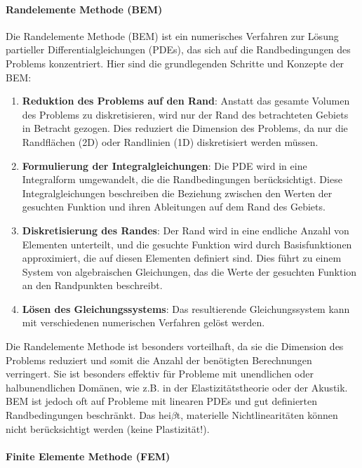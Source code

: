 \paragraph{Randelemente Methode (BEM)}

Die Randelemente Methode (BEM) ist ein numerisches Verfahren zur Lösung partieller Differentialgleichungen (PDEs), das sich auf die Randbedingungen des Problems konzentriert. Hier sind die grundlegenden Schritte und Konzepte der BEM:

\begin{enumerate}
\item \textbf{Reduktion des Problems auf den Rand}: Anstatt das gesamte Volumen des Problems zu diskretisieren, wird nur der Rand des betrachteten Gebiets in Betracht gezogen. Dies reduziert die Dimension des Problems, da nur die Randflächen (2D) oder Randlinien (1D) diskretisiert werden müssen.
\item \textbf{Formulierung der Integralgleichungen}: Die PDE wird in eine Integralform umgewandelt, die die Randbedingungen berücksichtigt. Diese Integralgleichungen beschreiben die Beziehung zwischen den Werten der gesuchten Funktion und ihren Ableitungen auf dem Rand des Gebiets.
\item \textbf{Diskretisierung des Randes}: Der Rand wird in eine endliche Anzahl von Elementen unterteilt, und die gesuchte Funktion wird durch Basisfunktionen approximiert, die auf diesen Elementen definiert sind. Dies führt zu einem System von algebraischen Gleichungen, das die Werte der gesuchten Funktion an den Randpunkten beschreibt.
\item \textbf{Lösen des Gleichungssystems}: Das resultierende Gleichungssystem kann mit verschiedenen numerischen Verfahren gelöst werden.
\end{enumerate}

Die Randelemente Methode ist besonders vorteilhaft, da sie die Dimension des Problems reduziert und somit die Anzahl der benötigten Berechnungen verringert. Sie ist besonders effektiv für Probleme mit unendlichen oder halbunendlichen Domänen, wie z.B. in der Elastizitätstheorie oder der Akustik. BEM ist jedoch oft auf Probleme mit linearen PDEs und gut definierten Randbedingungen beschränkt. Das hei$\beta$t, materielle Nichtlinearitäten können nicht berücksichtigt werden (keine Plastizität!).


\paragraph{Finite Elemente Methode (FEM)}


